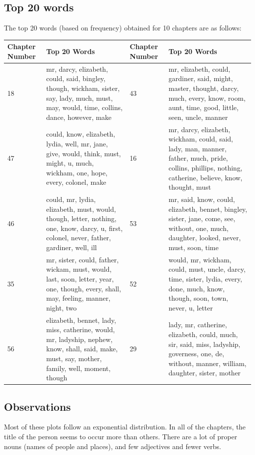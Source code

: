 \documentclass{article}
\begin{document}
\subsection{Top 20 words}
\begin{flushleft}
The top 20 words (based on frequency) obtained for 10 chapters are as follows:
\begin{center}
\begin{tabular}{|p{}|p{}||p{}|p{}|}
\hline
Chapter Number & Top 20 Words & Chapter Number & Top 20 Words \\
\hline
\hline
18 & mr, darcy, elizabeth, could, said, bingley, though, wickham, sister, say, lady, much, must, may, would, time, collins, dance, however, make &
43 & mr, elizabeth, could, gardiner, said, might, master, thought, darcy, much, every, know, room, aunt, time, good, little, seen, uncle, manner \\ 
\hline
47 & could, know, elizabeth, lydia, well, mr, jane, give, would, think, must, might, u, much, wickham, one, hope, every, colonel, make  &
16 & mr, darcy, elizabeth, wickham, could, said, lady, man, manner, father, much, pride, collins, phillips, nothing, catherine, believe, know, thought, must \\
\hline
46 & could, mr, lydia, elizabeth, must, would, though, letter, nothing, one, know, darcy, u, first, colonel, never, father, gardiner, well, ill &
53 & mr, said, know, could, elizabeth, bennet, bingley, sister, jane, come, see, without, one, much, daughter, looked, never, must, soon, time \\
\hline
35 & mr, sister, could, father,  wickam, must, would, last, soon, letter, year, one, though, every, shall, may, feeling, manner, night, two  &
52 & would, mr, wickham, could, must, uncle, darcy, time, sister, lydia, every, done, much, know, though, soon, town, never, u, letter  \\
\hline
56 & elizabeth, bennet, lady, miss, catherine, would, mr, ladyship, nephew, know, shall, said, make, must, say, mother, family, well, moment, though &
29 & lady, mr, catherine, elizabeth, could, much, sir, said, miss, ladyship, governess, one, de, without, manner, william, daughter, sister, mother \\
\hline
\end{tabular}
\end{center}
\end{flushleft}

\subsection{Observations}
Most of these plots follow an exponential distribution. In all of the chapters, the title of the person seems to occur more than others. There are a lot of proper nouns (names of people and places), and few adjectives and fewer verbs.
\end{document}
